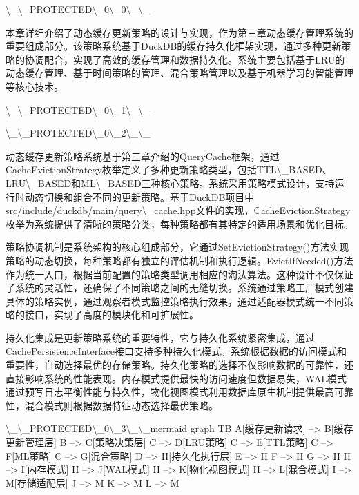 \textbackslash{}_\textbackslash{}_PROTECTED\textbackslash{}_0\textbackslash{}_0\textbackslash{}_\textbackslash{}_

本章详细介绍了动态缓存更新策略的设计与实现，作为第三章动态缓存管理系统的重要组成部分。该策略系统基于DuckDB的缓存持久化框架实现，通过多种更新策略的协调配合，实现了高效的缓存管理和数据持久化。系统主要包括基于LRU的动态缓存管理、基于时间策略的管理、混合策略管理以及基于机器学习的智能管理等核心技术。

\textbackslash{}_\textbackslash{}_PROTECTED\textbackslash{}_0\textbackslash{}_1\textbackslash{}_\textbackslash{}_

\textbackslash{}_\textbackslash{}_PROTECTED\textbackslash{}_0\textbackslash{}_2\textbackslash{}_\textbackslash{}_

动态缓存更新策略系统基于第三章介绍的QueryCache框架，通过CacheEvictionStrategy枚举定义了多种更新策略类型，包括TTL\textbackslash{}_BASED、LRU\textbackslash{}_BASED和ML\textbackslash{}_BASED三种核心策略。系统采用策略模式设计，支持运行时动态切换和组合不同的更新策略。基于DuckDB项目中src/include/duckdb/main/query\textbackslash{}_cache.hpp文件的实现，CacheEvictionStrategy枚举为系统提供了清晰的策略分类，每种策略都有其特定的适用场景和优化目标。

策略协调机制是系统架构的核心组成部分，它通过SetEvictionStrategy()方法实现策略的动态切换，每种策略都有独立的评估机制和执行逻辑。EvictIfNeeded()方法作为统一入口，根据当前配置的策略类型调用相应的淘汰算法。这种设计不仅保证了系统的灵活性，还确保了不同策略之间的无缝切换。系统通过策略工厂模式创建具体的策略实例，通过观察者模式监控策略执行效果，通过适配器模式统一不同策略的接口，实现了高度的模块化和可扩展性。

持久化集成是更新策略系统的重要特性，它与持久化系统紧密集成，通过CachePersistenceInterface接口支持多种持久化模式。系统根据数据的访问模式和重要性，自动选择最优的存储策略。持久化策略的选择不仅影响数据的可靠性，还直接影响系统的性能表现。内存模式提供最快的访问速度但数据易失，WAL模式通过预写日志平衡性能与持久性，物化视图模式利用数据库原生机制提供最高可靠性，混合模式则根据数据特征动态选择最优策略。

\textbackslash{}_\textbackslash{}_PROTECTED\textbackslash{}_0\textbackslash{}_3\textbackslash{}_\textbackslash{}_mermaid
graph TB
    A[缓存更新请求] --> B[缓存更新管理层]
    B --> C[策略决策层]
    C --> D[LRU策略]
    C --> E[TTL策略]
    C --> F[ML策略]
    C --> G[混合策略]
    D --> H[持久化执行层]
    E --> H
    F --> H
    G --> H
    H --> I[内存模式]
    H --> J[WAL模式]
    H --> K[物化视图模式]
    H --> L[混合模式]
    I --> M[存储适配层]
    J --> M
    K --> M
    L --> M

